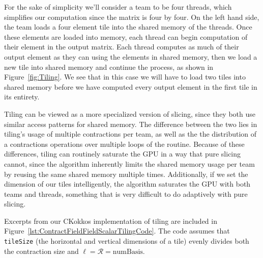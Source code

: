 For the sake of simplicity we'll consider a team to be four threads, which
simplifies our computation since the matrix is four by four. On the left hand
side, the team loads a four element tile into the shared memory of the
threads. Once these elements are loaded into memory, each thread can begin
computation of their element in the output matrix. Each thread computes as much
of their output element as they can using the elements in shared memory, then
we load a new tile into shared memory and continue the process, as shown in Figure~\ref{fig:Tiling}.
We see that in this case we will have to load two tiles into shared memory
before we have computed every output element in the first tile in its entirety. 


    Tiling can be viewed as a more specialized version of slicing, since they
both use similar access patterns for shared memory. The difference between the
two lies in tiling's usage of multiple contractions per team, as well as the
the distribution of a contractions operations over multiple loops of the
routine. Because of these differences, tiling can routinely saturate the GPU in
a way that pure slicing cannot, since the algorithm inherently limits the
shared memory usage per team by reusing the same shared memory multiple times.
Additionally, if we set the dimension of our tiles intelligently, the algorithm
saturates the GPU with both teams and threads, something that is very
difficult to do adaptively with pure slicing. 
	
    Excerpts from our CKokkos implementation of tiling are included in Figure~\ref{lst:ContractFieldFieldScalarTilingCode}. The
code assumes that \texttt{tileSize} (the horizontal and vertical dimensions of a tile)
evenly divides both the contraction size and $\ell = \mathcal{R} =
\text{numBasis}$.
	
